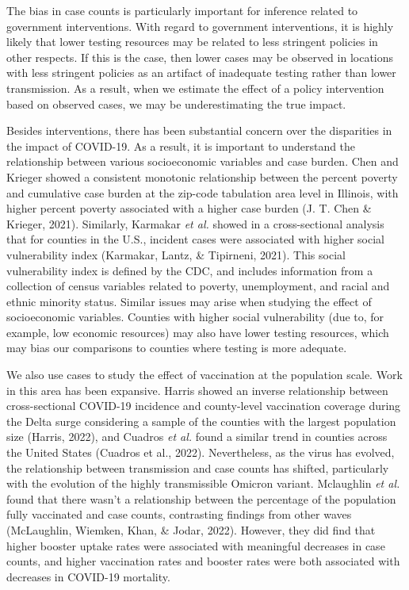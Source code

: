 \documentclass[12pt,twoside]{smiththesis}
\begin{document}
The bias in case counts is particularly important for inference related to government interventions. With regard to government interventions, it is highly likely that lower testing resources may be related to less stringent policies in other respects. If this is the case, then lower cases may be observed in locations with less stringent policies as an artifact of inadequate testing rather than lower transmission. As a result, when we estimate the effect of a policy intervention based on observed cases, we may be underestimating the true impact.

Besides interventions, there has been substantial concern over the disparities in the impact of COVID-19. As a result, it is important to understand the relationship between various socioeconomic variables and case burden. Chen and Krieger showed a consistent monotonic relationship between the percent poverty and cumulative case burden at the zip-code tabulation area level in Illinois, with higher percent poverty associated with a higher case burden (J. T. Chen \& Krieger, 2021). Similarly, Karmakar \emph{et al.} showed in a cross-sectional analysis that for counties in the U.S., incident cases were associated with higher social vulnerability index (Karmakar, Lantz, \& Tipirneni, 2021). This social vulnerability index is defined by the CDC, and includes information from a collection of census variables related to poverty, unemployment, and racial and ethnic minority status.
Similar issues may arise when studying the effect of socioeconomic variables. Counties with higher social vulnerability (due to, for example, low economic resources) may also have lower testing resources, which may bias our comparisons to counties where testing is more adequate.

We also use cases to study the effect of vaccination at the population scale. Work in this area has been expansive. Harris showed an inverse relationship between cross-sectional COVID-19 incidence and county-level vaccination coverage during the Delta surge considering a sample of the counties with the largest population size (Harris, 2022), and Cuadros \emph{et al.} found a similar trend in counties across the United States (Cuadros et al., 2022). Nevertheless, as the virus has evolved, the relationship between transmission and case counts has shifted, particularly with the evolution of the highly transmissible Omicron variant. Mclaughlin \emph{et al.} found that there wasn't a relationship between the percentage of the population fully vaccinated and case counts, contrasting findings from other waves (McLaughlin, Wiemken, Khan, \& Jodar, 2022). However, they did find that higher booster uptake rates were associated with meaningful decreases in case counts, and higher vaccination rates and booster rates were both associated with decreases in COVID-19 mortality.
\end{document}

